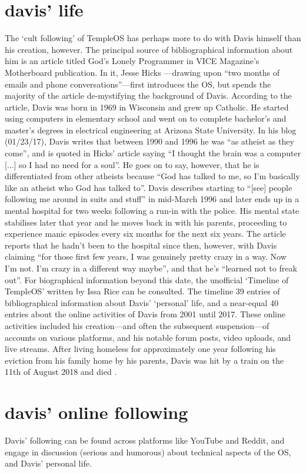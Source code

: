 \documentclass[a4paper]{article}
\begin{document}
\section*{davis' life}
The `cult following' of TempleOS has perhaps
more to do with Davis himself than his creation, however.
The principal source of bibliographical information about him is
an article titled God’s Lonely Programmer
in VICE Magazine’s Motherboard publication.
In it, Jesse Hicks \parencite*{Hicks14}---drawing
upon ``two months of emails and phone conversations''---first
introduces the OS,
but spends the majority of the article de-mystifying the background of Davis.
According to the article,
Davis was born in 1969 in Wisconsin and grew up Catholic.
He started using computers in elementary school
and went on to complete bachelor's and master's degrees
in electrical engineering at Arizona State University.
In his blog (01/23/17), Davis writes that
between 1990 and 1996 he was ``as atheist as they come'',
and is quoted in Hicks' article saying
``I thought the brain was a computer [...] so I had no need for a soul''.
He goes on to say, however, that he is differentiated from other atheists
because ``God has talked to me,
so I'm basically like an atheist who God has talked to''.
Davis describes starting to
``[see] people following me around in suits and stuff'' in mid-March 1996
and later ends up in a mental hospital for two weeks
following a run-in with the police.
His mental state stabilises later that year
and he moves back in with his parents,
proceeding to experience manic episodes every six months for the next six years.
The article reports that he hadn't been to the hospital since then, however,
with Davis claiming
``for those first few years, I was genuinely pretty crazy in a way.
Now I'm not. I'm crazy in a different way maybe'',
and that he's ``learned not to freak out''.
For biographical information beyond this date,
the unofficial `Timeline of TempleOS' written by Issa Rice
\parencite*{Rice18} can be consulted.
The timeline 39 entries of bibliographical information
about Davis' `personal' life, and a near-equal 40 entries about
the online activities of Davis from 2001 until 2017.
These online activities included his creation---and
often the subsequent suspension---of accounts on various platforms,
and his notable forum posts, video uploads, and live streams.
After living homeless for approximately one year following
his eviction from his family home by his parents,
Davis was hit by a train on the 11th of August 2018 and died \parencite{Cecil18}.

\section*{davis' online following}
Davis' following can be found across platforms like YouTube and Reddit,
and engage in discussion (serious and humorous) about
technical aspects of the OS, and Davis’ personal life.

\printbibliography
\end{document}
